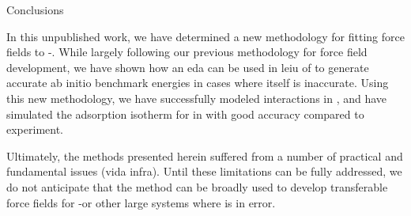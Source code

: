 \begin{section}{Conclusions}
\label{sec:lmoeda-conclusions}

In this unpublished work, we have determined a new methodology for fitting
force fields to \cus-\mofs. While largely following our previous methodology
for \mof force field development, we have shown how an \lmoeda \acrlong{eda}
can be used in leiu of \sapt to generate accurate ab initio benchmark energies
in cases where \sapt itself is inaccurate. Using this new methodology, we have
successfully modeled \co interactions in \mgmof, and have simulated the
adsorption isotherm for \co in \mgmof with good accuracy compared to
experiment.

Ultimately, the methods presented herein suffered from a number of practical
and fundamental issues (vida infra). Until these
limitations can be fully addressed, we do not anticipate that the \lmoeda
method can be broadly used to develop transferable force fields for \cus-\mofs or other
large systems where \sapt is in error.

\end{section}
